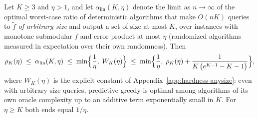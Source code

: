 \begin{proposition}
\label{thm:linear-anysize}
Let $K\ge3$ and $\eta>1$, and let $\alpha_{\mathrm{lin}}(K,\eta)$ denote
the limit as $n\to\infty$ of the optimal worst-case ratio of deterministic
algorithms that make $O(nK)$ queries to $\tilde f$ \emph{of arbitrary
size} and output a set of size at most $K$, over instances with monotone
submodular $f$ and error product at most $\eta$ (randomized algorithms
measured in expectation over their own randomness).  Then
\[
  \rho_K(\eta)\;\le\;\alpha_{\mathrm{lin}}(K,\eta)\;\le\;
  \min\Bigl\{\frac1\eta,\;W_K(\eta)\Bigr\}
  \;\le\;
  \min\Bigl\{\frac1\eta,\;\rho_K(\eta)+\frac{1}{K\,\bigl(e^{K-1}-K-1\bigr)}\Bigr\},
\]
where $W_K(\eta)$ is the explicit constant of
Appendix~\ref{app:hardness-anysize}: even with arbitrary-size queries,
predictive greedy is optimal among algorithms of its own oracle
complexity up to an additive term exponentially small in $K$.  For
$\eta\ge K$ both ends equal $1/\eta$.
\end{proposition}
